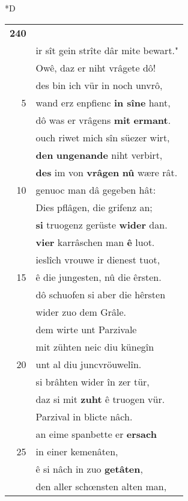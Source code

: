 \documentclass[8pt,a4paper,notitlepage]{article}
\begin{document}
\begin{table}[ht]
\begin{minipage}[t]{0.5\linewidth}
\small
\begin{center}*D
\end{center}
\begin{tabular}{rl}
\textbf{240} & \textbf{\begin{large}S\end{large}wenne ir geprüevet} sînen art,\\ 
 & ir sît gein strîte dâr mite bewart."\\ 
 & Owê, daz er niht vrâgete dô!\\ 
 & des bin ich vür in noch unvrô,\\ 
5 & wand erz enpfienc \textbf{in sîne} hant,\\ 
 & dô was er vrâgens \textbf{mit} \textbf{ermant}.\\ 
 & ouch riwet mich sîn süezer wirt,\\ 
 & \textbf{den} \textbf{ungenande} niht verbirt,\\ 
 & \textbf{des} im von \textbf{vrâgen} \textbf{nû} wære rât.\\ 
10 & genuoc man dâ gegeben hât:\\ 
 & Dies pflâgen, die grifenz an;\\ 
 & \textbf{si} truogenz gerüste \textbf{wider} dan.\\ 
 & \textbf{vier} karrâschen man \textbf{ê} luot.\\ 
 & ieslîch vrouwe ir dienest tuot,\\ 
15 & ê die jungesten, nû die êrsten.\\ 
 & dô schuofen si aber die hêrsten\\ 
 & wider zuo dem Grâle.\\ 
 & dem wirte unt Parzivale\\ 
 & mit zühten neic diu künegîn\\ 
20 & unt al diu juncvröuwelîn.\\ 
 & si brâhten wider în zer tür,\\ 
 & daz si mit \textbf{zuht} ê truogen vür.\\ 
 & Parzival in blicte nâch.\\ 
 & an eime spanbette er \textbf{ersach}\\ 
25 & in einer kemenâten,\\ 
 & ê si nâch in zuo \textbf{getâten},\\ 
 & den aller schœnsten alten man,\\ 

\end{tabular}
\end{minipage}
\end{table}
\end{document}
